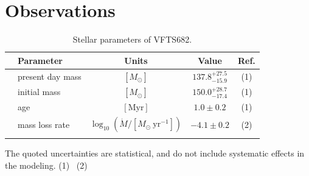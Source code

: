 \documentclass[a4paper,fleqn,usenatbib]{mnras}
\begin{document}
\section{Observations}
\label{sec:sample}

\begin{table}
  \begin{center}
    \caption{Stellar parameters of VFTS682.}
    \vspace*{-15pt}
    \begin{tabular}{llc|c|c}
      \hline\hline
      &Parameter & Units & Value & Ref.\\     
       \hline
     & present day mass  & $[M_\odot]$ & $137.8^{+27.5}_
                                           {-15.9}$ & (1)
                                                    \\
      & initial mass& $[M_\odot]$ & $150.0^{+28.7}_{-17.4}$ & (1)
      \\
      &age & $[\mathrm{Myr}]$ & $1.0\pm0.2$ & (1) \\
      & mass loss rate & $\log_{10}(\dot{M}/[M_\odot \ \mathrm{yr}^{-1}])$ & $-4.1\pm0.2$ & (2)\\
      \hline
      \label{tab:star_param}
    \end{tabular}
    \vspace*{-5pt}
    {\tiny The quoted uncertainties are statistical, and do not include systematic
      effects in the modeling.
      (1)~\cite{schneider:18}
      (2)~\cite{bestenlehner:11}}
  \end{center}
\end{table}
\end{document}
